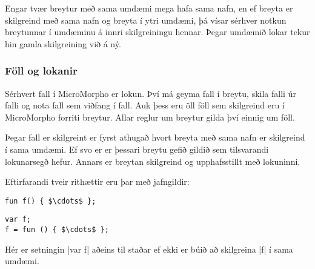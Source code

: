\documentclass[12pt]{article}
\begin{document}
Engar tvær breytur með sama umdæmi mega hafa sama nafn, en
ef breyta er skilgreind með sama nafn og breyta í ytri umdæmi,
þá vísar sérhver notkun breytunnar í umdæminu á innri skilgreiningu hennar.
Þegar umdæmið lokar tekur hin gamla skilgreining við á ný.

\subsubsection{Föll og lokanir}
Sérhvert fall í MicroMorpho er lokun. Því má geyma fall
í breytu, skila falli úr falli og nota fall sem viðfang í fall.
Auk þess eru öll föll sem skilgreind eru í MicroMorpho forriti breytur.
Allar reglur um breytur gilda því einnig um föll.

Þegar fall er skilgreint er fyrst athugað hvort breyta með sama nafn er skilgreind
í sama umdæmi. Ef svo er er þessari breytu gefið gildið sem tilsvarandi lokunarsegð hefur.
Annars er breytan skilgreind og upphafsstillt með lokuninni.

Eftirfarandi tveir rithættir eru þar með jafngildir:

\null\hfill%
\begin{minipage}{0.5\textwidth + 1pt}
\begin{mdframed}[style=langframe]
\begin{minipage}[t][24pt][t]{\textwidth}
\begin{Verbatim}[commandchars=\\?!,codes={\catcode`$=3\catcode`^=7}]
fun f() { $\cdots$ };
\end{Verbatim}
\end{minipage}
\end{mdframed}
\end{minipage}%
\hspace*{-2pt}%
\begin{minipage}{0.5\textwidth + 1pt}
\begin{mdframed}[style=langframe]
\begin{minipage}[t][24pt][t]{\textwidth}
\begin{Verbatim}[commandchars=\\?!,codes={\catcode`$=3\catcode`^=7}]
var f;
f = fun () { $\cdots$ };
\end{Verbatim}
\end{minipage}
\end{mdframed}
\end{minipage}%
\hfill\null
\bigskip

Hér er setningin |var f| aðeins til staðar ef ekki er búið
að skilgreina |f| í sama umdæmi.
\end{document}

